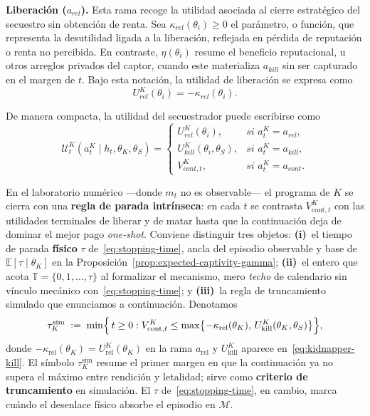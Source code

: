 \documentclass[12pt]{article}
\theoremstyle{definition}
\theoremstyle{remark}
\newcommand{\1}{\mathbf{1}}
\begin{document}
  

  \textbf{Liberación ($a_{rel}$).} Esta rama recoge la utilidad asociada al cierre estratégico del secuestro sin obtención de renta. Sea $\kappa_{rel}(\theta_i)\ge 0$ el parámetro, o función, que representa la desutilidad ligada a la liberación, reflejada en pérdida de reputación o renta no percibida. En contraste, $\eta(\theta_i)$ resume el beneficio reputacional, u otros arreglos privados del captor, cuando este materializa $a_{kill}$ sin ser capturado en el margen de $t$. Bajo esta notación, la utilidad de liberación se expresa como
  \[
  U^K_{rel}(\theta_i) = -\kappa_{rel}(\theta_i).
  \]

\noindent De manera compacta, la utilidad del secuestrador puede escribirse como
\begin{equation}
\label{eq:kidnapper-utility-general}
\mathcal{U}^K_t(a_t^K \mid h_t,\theta_K,\theta_S)
=
\begin{cases}
U^K_{rel}(\theta_i), & \textit{si } a_t^K = a_{rel},\\
U^K_{kill}(\theta_i,\theta_S), & \textit{si } a_t^K = a_{kill},\\
V^K_{cont,t}, & \textit{si } a_t^K = a_{cont}.
\end{cases}
\end{equation}


En el laboratorio numérico ---donde $m_t$ no es observable--- el programa de $K$ se cierra con una \textbf{regla de parada intrínseca}: en cada $t$ se contrasta $V^K_{\mathrm{cont},t}$ con las utilidades terminales de liberar y de matar hasta que la continuación deja de dominar el mejor pago \emph{one-shot}. Conviene distinguir tres objetos: \textbf{(i)}~el tiempo de parada \textbf{físico} $\tau$ de~\eqref{eq:stopping-time}, ancla del episodio observable y base de $\mathbb{E}[\tau\mid\theta_K]$ en la Proposición~\ref{prop:expected-captivity-gamma}; \textbf{(ii)}~el entero que acota $\mathbb{T}=\{0,1,\ldots,\tau\}$ al formalizar el mecanismo, mero \emph{techo} de calendario sin vínculo mecánico con~\eqref{eq:stopping-time}; y \textbf{(iii)}~la regla de truncamiento simulado que enunciamos a continuación. Denotamos
\begin{equation}
\label{eq:tau-K-pure-simulation}
\tau_K^{\mathrm{sim}}
\;:=\;
\min\Bigl\{\, t\ge 0 : V^K_{\mathrm{cont},t} \le \max\bigl\{-\kappa_{\mathrm{rel}}(\theta_K),\,U^K_{\mathrm{kill}}(\theta_K,\theta_S)\bigr\} \Bigr\},
\end{equation}
donde $-\kappa_{\mathrm{rel}}(\theta_K)=U^K_{\mathrm{rel}}(\theta_K)$ en la rama $a_{\mathrm{rel}}$ y $U^K_{\mathrm{kill}}$ aparece en~\eqref{eq:kidnapper-kill}. El símbolo $\tau_K^{\mathrm{sim}}$ resume el primer margen en que la continuación ya no supera el máximo entre rendición y letalidad; sirve como \textbf{criterio de truncamiento} en simulación. El $\tau$ de~\eqref{eq:stopping-time}, en cambio, marca cuándo el desenlace físico absorbe el episodio en $\mathcal{M}$.
\end{document}

